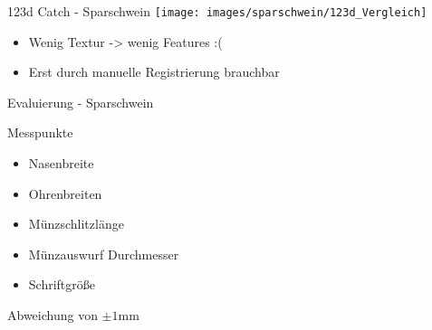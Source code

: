 \documentclass[11pt]{beamer}
\begin{document}
\begin{frame}{123d Catch - Sparschwein}
\center
	\texttt{[image: images/sparschwein/123d\_Vergleich]}
	\begin{block}{}
		\begin{itemize}
			\item Wenig Textur -> wenig Features :(
			\item Erst durch manuelle Registrierung brauchbar
		\end{itemize}
	\end{block}
\end{frame}

\begin{frame}{Evaluierung - Sparschwein}
	\begin{block}{Messpunkte}
		\begin{itemize}
			\item Nasenbreite
			\item Ohrenbreiten
			\item Münzschlitzlänge
			\item Münzauswurf Durchmesser
			\item Schriftgröße
		\end{itemize}
	\end{block}
	\begin{block}{}
		Abweichung von $\pm1$mm
	\end{block}
\end{frame}
\end{document}
